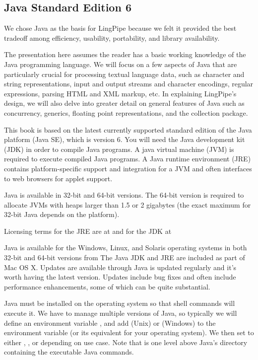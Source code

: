 \subsection{Java Standard Edition 6}

We chose Java as the basis for LingPipe because we felt it
provided the best tradeoff among efficiency, usability, portability,
and library availability.

The presentation here assumes the reader has a basic working knowledge
of the Java programming language.  We will focus on a few aspects of
Java that are particularly crucial for processing textual language
data, such as character and string representations, input and output
streams and character encodings, regular expressions, parsing HTML and
XML markup, etc.  In explaining LingPipe's design, we will also delve
into greater detail on general features of Java such as concurrency,
generics, floating point representations, and the collection package.

This book is based on the latest currently supported standard edition
of the Java platform (Java SE), which is version 6.  You will need the
Java development kit (JDK) in order to compile Java programs.  A java
virtual machine (JVM) is required to execute compiled Java programs.
A Java runtime environment (JRE) contains platform-specific support
and integration for a JVM and often interfaces to web browsers for
applet support.

Java is available in 32-bit and 64-bit versions.  The 64-bit version
is required to allocate JVMs with heaps larger than 1.5 or 2 gigabytes
(the exact maximum for 32-bit Java depends on the platform).  


Licensing terms for the JRE are at
%
%
and for the JDK at
%

Java is available for the Windows, Linux, and Solaris operating
systems in both 32-bit and 64-bit versions from
%
%
The Java JDK and JRE are included as part of Mac OS X.  Updates are
available through
%
%
Java is updated regularly and it's worth having the latest version.
Updates include bug fixes and often include performance enhancements,
some of which can be quite substantial.

Java must be installed on the operating system so that shell commands
will execute it.  We have to manage multiple versions of Java, so
typically we will define an environment variable , and
add  (Unix) or  (Windows) 
to the  environment variable (or its equivalent for your
operating system).  We then set  to either , , or  depending on use
case.  Note that  is one level above Java's 
directory containing the executable Java commands.

